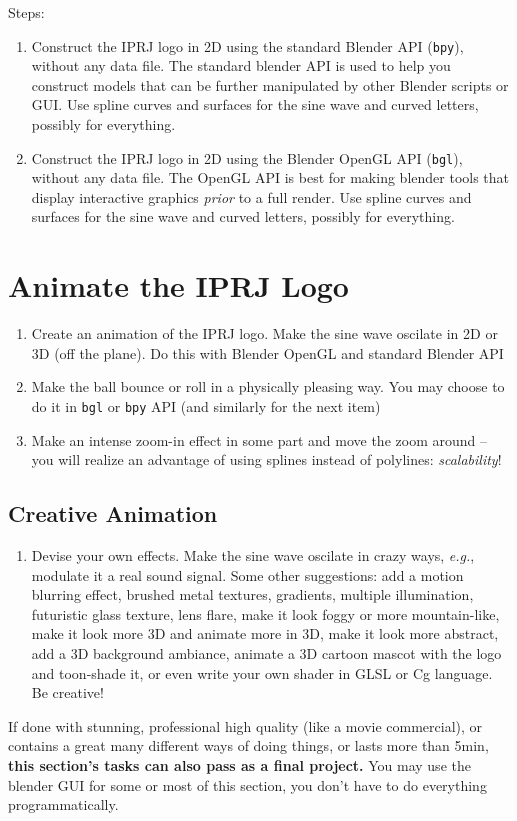 \documentclass[a4paper]{article}
\newcommand{\eg}{{\it e.g.}}
\begin{document}
Steps:
\begin{enumerate}
\item Construct the IPRJ logo in 2D using the standard Blender API
(\texttt{bpy}), without any
data file. The standard blender API is used to help you construct models that
can be further manipulated by other Blender scripts or GUI. Use 
spline curves and surfaces for the sine wave and curved letters, possibly for everything.
\item Construct the IPRJ logo in 2D using the Blender OpenGL API
(\texttt{bgl}), without any
data file. The OpenGL API is best for making blender tools that display
interactive graphics
\emph{prior} to a full render. Use 
spline curves and surfaces for the sine wave and curved letters, possibly for everything.
\end{enumerate}

\section{Animate the IPRJ Logo}
\begin{enumerate}
\item Create an animation of the IPRJ logo. Make the sine wave oscilate in 2D or 
3D (off the plane). Do this with Blender OpenGL and standard Blender API
\item Make the ball bounce or roll in a physically pleasing way. You may choose
to do it in \texttt{bgl} or \texttt{bpy} API (and similarly for the next item)
\item Make an intense zoom-in effect in some part and move the zoom around --
you will realize an advantage of
using splines instead of polylines: \emph{scalability}!
\end{enumerate}

\subsection{Creative Animation}
\begin{enumerate}
\item Devise your own effects. Make the sine wave oscilate in crazy ways,
\eg, modulate it a real sound signal. Some other suggestions: add a motion blurring effect, brushed
metal textures, gradients, multiple illumination, futuristic glass texture, lens
flare, make it look foggy or more mountain-like, make it look more 3D and
animate more in 3D, make it look more
abstract, add a 3D background ambiance, animate a 3D cartoon mascot with the
logo and toon-shade it, or even write your own shader in GLSL or Cg language. Be creative!
\end{enumerate}
If done with
stunning, professional high quality (like a movie commercial), or contains a great many different ways of
doing things, or lasts more than 5min, \textbf{this section's tasks can also
pass as a final project.}
You may use the blender GUI for some or most of this section, you don't have to do everything programmatically.



\end{document}
